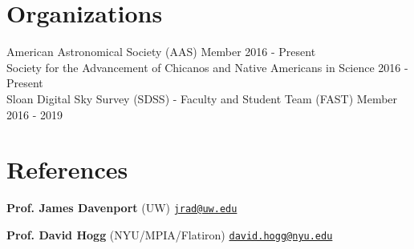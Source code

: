 \documentclass[margin,line]{resume}
\newcommand{\tab}[1]{\hspace{.2667\textwidth}\rlap{#1}}
\newcommand{\itab}[1]{\hspace{0em}\rlap{#1}}
\begin{document}
\begin{resume}

\section{\mysidestyle \textcolor{bcolor}{Organizations}}
American Astronomical Society (AAS) Member \hfill 2016 - Present \\
Society for the Advancement of Chicanos and Native Americans in Science \hfill 2016 - Present \\
Sloan Digital Sky Survey (SDSS) - Faculty and Student Team (FAST) Member \hfill 2016 - 2019 




\section{\mysidestyle \textcolor{bcolor}{References}}
\textbf{Prof. James Davenport} (UW) \hfill {\tt \href{jrad@uw.edu}{jrad@uw.edu}} 

\textbf{Prof. David Hogg} (NYU/MPIA/Flatiron) \hfill {\tt \href{david.hogg@nyu.edu}{david.hogg@nyu.edu}} 


\end{resume}
\end{document}
